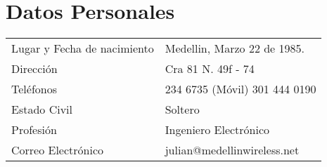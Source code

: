 \documentclass[a4paper, oneside, final, letter]{scrartcl}
\begin{document}
\begin{center}

\textsc{}

\section{Datos Personales}
\begin{tabularx}{0.97\linewidth}{p{6cm}X}
 Lugar y Fecha de nacimiento & Medellin, Marzo 22 de 1985.\\
 Direcci\'on & Cra 81 N. 49f - 74 \\
 Tel\'efonos & 234 6735 (M\'ovil) 301 444 0190\\
 Estado Civil & Soltero \\
 Profesi\'on & Ingeniero Electr\'onico \\
 Correo Electr\'onico & julian@medellinwireless.net
\end{tabularx}
\end{center}
\end{document}
